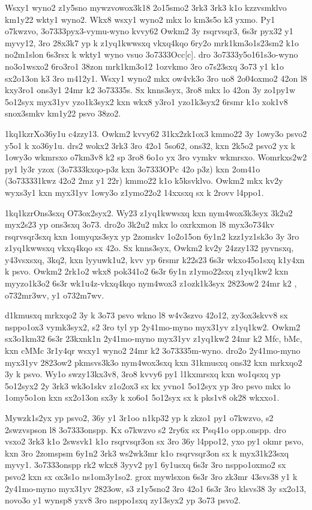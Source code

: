 Wsxy1 wyno2 z1y5sno mywzvowox3k18 2o15smo2 3rk3 3rk3 k1o kzzvsmklvo
km1y22 wkty1 wyno2.  Wkx8 wsxy1 wyno2 mkx lo km3s5o k3 yxmo.  Py1
o7kwzvo, \23o7333{pyx3-vymu-wyno} kvvy62 Owkm2 3y rsqrvsqr3, 6s3r
pyx32 y1 myvy12, 3ro 28x3k7 yp k z1yq1kwwsxq vkxq4kqo 6ry2o
mrk1km3o1s23sm2 k1o no2m1slon 6s3rsx k wkty1 wyno vsuo
\23o7333{Occ[c]}.  dro \23o7333{y5o161s3o-wyno} no3o1wsxo2 6ro3ro1
38zon mrk1km3o12 1ozvkmo 3ro o7s23sxq 3o73 y1 k1o sx2o13on k3 3ro
m412y1.  Wsxy1 wyno2 mkx ow4vk3o 3ro uo8 2o04oxmo2 42on l8 kxy3ro1
ons3y1 24mr k2 \23o7333{5s}.  Sx knns3syx, 3ro8 mkx lo 42on 3y zo1py1w
5o12syx myx31yv yzo1k3syx2 kxn wkx8 y3ro1 yzo1k3syx2 6rsmr k1o xok1v8
snox3smkv km1y22 psvo 38zo2.

\zk1kq1kzr{Xo36y1u c4zzy13.}
Owkm2 kvvy62 31kx2zk1ox3 kmmo22 3y 1owy3o psvo2 y5o1 k xo36y1u.  drs2
wokx2 3rk3 3ro 42o1 5so62, ons32, kxn 2k5o2 psvo2 yx k 1owy3o wkmrsxo
o7km3v8 k2 sp 3ro8 6o1o yx 3ro vymkv wkmrsxo.  Womrkxs2w2 py1 ly3r
yzox (\23o7333{kxqo-p3z} kxn \23o7333{OPc} 42o p3z) kxn 2om41o
(\23o7333{31kwz} 42o2 2mz y1 22r) kmmo22 k1o k5ksvklvo.  Owkm2 mkx
kv2y wyxs3y1 kxn myx31yv 1owy3o z1ymo22o2 14xxsxq sx k 2rovv l4ppo1.

\zk1kq1kzr{Ons3sxq O73ox2syx2.}
Wy23 z1yq1kwwsxq kxn nym4wox3k3syx 3k2u2 myx2s23 yp ons3sxq 3o73.
dro2o 3k2u2 mkx lo oxrkxmon l8 myx3o734kv rsqrvsqr3sxq kxn 1omyqxs3syx
yp 2zomskv 1o2o15on 6y1n2 kzz1yz1sk3o 3y 3ro z1yq1kwwsxq vkxq4kqo sx
42o.  Sx knns3syx, Owkm2 kv2y 24zzy132 pyvnsxq, y43vsxsxq, 3kq2, kxn
lyyuwk1u2, kvv yp 6rsmr k22s23 6s3r wkxo45o1sxq k1y4xn k psvo.  Owkm2
2rk1o2 wkx8 pok341o2 6s3r 6y1n z1ymo22sxq z1yq1kw2 kxn myyzo1k3o2 6s3r
wk1u4z-vkxq4kqo nym4wox3 z1ozk1k3syx 2823ow2 24mr k2 \Vkdoh,
\3o732m{r3wv}, y1 \3o732m{7wv}.

d1kmusxq mrkxqo2 3y k 3o73 psvo wkno l8 w4v3szvo 42o12, zy3ox3skvv8 sx
nsppo1ox3 vymk3syx2, s2 3ro tyl yp 2y41mo-myno myx31yv z1yq1kw2.
Owkm2 sx3o1km32 6s3r 23kxnk1n 2y41mo-myno myx31yv z1yq1kw2 24mr k2 Mfc, bMc,
kxn cMMc 3r1y4qr wsxy1 wyno2 24mr k2 \23o7333{5m-wyno}.  dro2o
2y41mo-myno myx31yv 2823ow2 pkmsvs3k3o nym4wox3sxq kxn 31kmusxq ons32 kxn
mrkxqo2 3y k psvo.  Wy1o swzy13kx3v8, 3ro8 kvvy6 py1 l1kxmrsxq kxn
wo1qsxq yp 5o12syx2 2y 3rk3 wk3o1skv z1o2ox3 sx kx yvno1 5o12syx yp
3ro psvo mkx lo 1omy5o1on kxn sx2o13on sx3y k xo6o1 5o12syx sx k
pks1v8 ok28 wkxxo1.

Mywzk1s2yx yp psvo2, 36y y1 3r1oo n1kp32 yp k zkzo1 py1 o7kwzvo, s2
2swzvspson l8 \23o7333{onspp}.  
Kx o7kwzvo s2 2ry6x sx Psq41o \1op{p.onspp}.  
dro vsxo2 3rk3 k1o 2swsvk1 k1o rsqrvsqr3on sx 3ro 36y
l4ppo12, yxo py1 okmr psvo, kxn 3ro 2zomspsm 6y1n2 3rk3 ws2wk3mr k1o
rsqrvsqr3on sx k myx31k23sxq myvy1.  \23o7333{onspp} rk2 wkx8 3yyv2
py1 6y1usxq 6s3r 3ro nsppo1oxmo2 sx psvo2 kxn sx ox3s1o ns1om3y1so2.
grox mywlsxon 6s3r 3ro zk3mr 43svs38 y1 k 2y41mo-myno myx31yv 2823ow,
s3 z1y5sno2 3ro 42o1 6s3r 3ro klsvs38 3y sx2o13, novo3o y1 wynsp8 yxv8
3ro nsppo1sxq zy13syx2 yp 3o73 psvo2.

